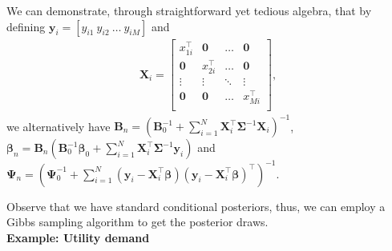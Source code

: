 We can demonstrate, through straightforward yet tedious algebra, that by defining $\bm{y}_i = [y_{i1} \ y_{i2} \ \dots \ y_{iM}]$ and
\begin{align*}
	\bm{X}_i=\begin{bmatrix}
		x_{1i}^{\top} & \bm{0} & \dots & \bm{0}\\
		\bm{0} & x_{2i}^{\top} & \dots & \bm{0}\\
		\vdots & \vdots & \ddots & \vdots\\
		\bm{0} & \bm{0} & \dots & x_{Mi}^{\top}\\
	\end{bmatrix},
\end{align*} 
we alternatively have $\bm{B}_n=(\bm{B}_0^{-1}+\sum_{i=1}^N \bm{X}_i^{\top}\bm{\Sigma}^{-1}\bm{X}_i)^{-1}$, $\bm{\beta}_n=\bm{B}_n(\bm{B}_0^{-1}\bm{\beta}_0+\sum_{i=1}^N \bm{X}_i^{\top}\bm{\Sigma}^{-1}\bm{y}_i)$ and $\bm{\Psi}_n = (\bm{\Psi}_0^{-1} + \sum_{i=1}^N (\bm{y}_i-\bm{X}_i^{\top}\bm{\beta}) (\bm{y}_i-\bm{X}_i^{\top}\bm{\beta})^{\top})^{-1}$.

Observe that we have standard conditional posteriors, thus, we can employ a Gibbs sampling algorithm to get the posterior draws.\\

\textbf{Example: Utility demand}

